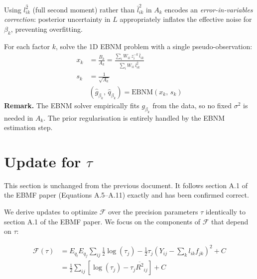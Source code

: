 \documentclass{article}[12pt]
\newcommand{\lbar}[2]{\bar{l}_{#1#2}}
\newcommand{\lsec}[2]{\overline{l^{2}_{#1#2}}}
\begin{document}
Using $\lsec{i}{k}$ (full second moment) rather than $\lbar{i}{k}^2$ in $A_k$
encodes an \emph{error-in-variables correction}: posterior uncertainty in $L$
appropriately inflates the effective noise for $\beta_k$, preventing overfitting.

\begin{ebnmbox}
For each factor $k$, solve the 1D EBNM problem with a single pseudo-observation:
\begin{align}
    x_k &= \frac{B_k}{A_k}
         = \frac{\displaystyle\sum_i W_{ii}\,z^{-k}_i\,\lbar{i}{k}}
                {\displaystyle\sum_i W_{ii}\,\lsec{i}{k}}
    \label{eq:xk-beta}\\[4pt]
    s_k &= \frac{1}{\sqrt{A_k}}
    \label{eq:sk-beta}\\[4pt]
    &\left(\hat{g}_{\beta_k},\,\hat{q}_{\beta_k}\right)
      = \mathrm{EBNM}(x_k,\, s_k)
\end{align}
\textbf{Remark.} The EBNM solver empirically fits $g_{\beta_k}$ from the data,
so no fixed $\sigma^2$ is needed in $A_k$. The prior regularisation is entirely
handled by the EBNM estimation step.
\end{ebnmbox}

\section{Update for $\tau$}

\begin{correctionbox}[title={Item 5: No Changes (Confirmed Correct from EBMF)}]
This section is unchanged from the previous document. It follows section A.1
of the EBMF paper (Equations A.5--A.11) exactly and has been confirmed correct.
\end{correctionbox}

We derive updates to optimize $\mathcal{F}$ over the precision parameters $\tau$
identically to section A.1 of the EBMF paper. We focus on the components of
$\mathcal{F}$ that depend on $\tau$:

\begin{align}
    \mathcal{F}(\tau)
    &= E_{q_l}E_{q_f}\sum_{ij}
       \frac{1}{2}\log(\tau_j) - \frac{1}{2}\tau_j\!\left(Y_{ij}-\sum_k l_{ik}f_{jk}\right)^2
       + C\\
    &= \frac{1}{2}\sum_{ij}\left[\log(\tau_j) - \tau_j\overline{R^2}_{ij}\right] + C
\end{align}
\end{document}
